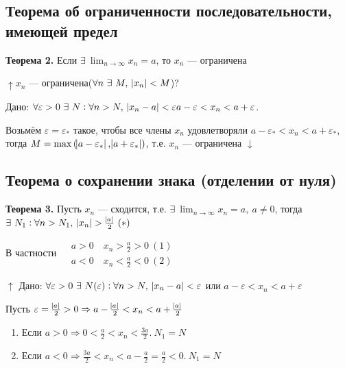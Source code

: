 \documentclass{article}
\begin{document}
    \subsection{Теорема об ограниченности последовательности, имеющей предел}
    
    \textbf{Теорема 2.} Если \(\exists\ \lim_{n \rightarrow \infty}{x_n} = a\), то \(x_n\) --- ограничена
    
    \(\uparrow x_n\) --- ограничена(\(\forall n\ \exists\ M,\ \abs{x_n} < M\))?
    
    Дано: \(\forall \varepsilon > 0\ \exists\ N : \forall n > N,\ \abs{x_n - a} < \varepsilon\\ a - \varepsilon < x_n < a + \varepsilon\).
    
    Возьмём \(\varepsilon = \varepsilon_*\) такое, чтобы все члены \(x_n\) удовлетворяли \(a - \varepsilon_* < x_n < a + \varepsilon_*\),\\
    тогда \(M = \max{(\abs{a - \varepsilon_*}, \abs{a + \varepsilon_*})}\), т.е. \(x_n\) --- ограничена \(\downarrow\)
    
    \subsection{Теорема о сохранении знака (отделении от нуля)}
    
    \textbf{Теорема 3.} Пусть \(x_n\) --- сходится, т.е. \(\exists\ \lim_{n \rightarrow \infty}{x_n} = a,\ a \not = 0\), тогда \(\exists\ N_1 : \forall n > N_1,\ \abs{x_n} > \frac{\abs{a}}{2}\ (*)\)
    
    В частности \(\begin{aligned}
    	&a > 0 \quad x_n > \frac{a}{2} > 0\ (1)\\
        &a < 0 \quad x_n < \frac{a}{2} < 0\ (2)
    \end{aligned}\)
    
    \(\uparrow\) Дано: \(\forall \varepsilon > 0\ \exists\ N(\varepsilon) : \forall n > N,\ \abs{x_n - a} < \varepsilon\) или \(a - \varepsilon < x_n < a + \varepsilon\)
    
    Пусть \(\varepsilon = \frac{\abs{a}}{2} > 0 \Rightarrow a - \frac{\abs{a}}{2} < x_n < a + \frac{\abs{a}}{2}\)
    \begin{enumerate}
    	\item Если \(a > 0 \Rightarrow 0 < \frac{a}{2} < x_n < \frac{3a}{2}.\ N_1 = N\)
        \item Если \(a < 0 \Rightarrow \frac{3a}{2} < x_n < a - \frac{a}{2} = \frac{a}{2} < 0.\ N_1 = N\)
    \end{enumerate}
    
\end{document}
